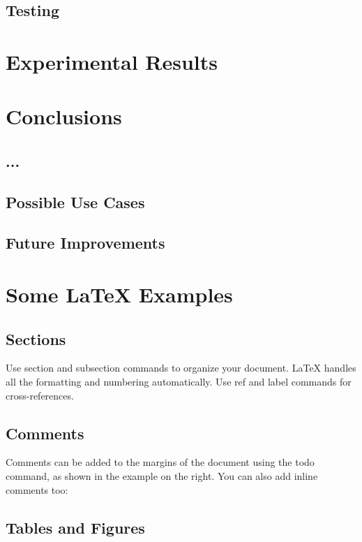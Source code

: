 \subsection{Testing}

\section{Experimental Results}

\section{Conclusions}
\subsection{...}
\subsection{Possible Use Cases}
\subsection{Future Improvements}


\section{Some \LaTeX{} Examples}
\label{sec:examples}

\subsection{Sections}

Use section and subsection commands to organize your document. \LaTeX{} handles all the formatting and numbering automatically. Use ref and label commands for cross-references.

\subsection{Comments}

Comments can be added to the margins of the document using the  todo command, as shown in the example on the right. You can also add inline comments too:


\subsection{Tables and Figures}

